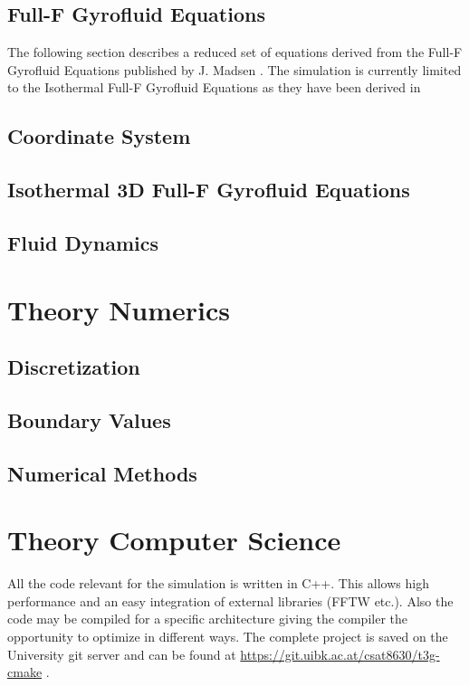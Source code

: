 \documentclass[12pt,oneside,bibtotoc,liststotoc]{scrbook}
\begin{document}
\section{Full-F Gyrofluid Equations}
The following section describes a reduced set of equations derived from the Full-F Gyrofluid Equations published by J. Madsen \cite{doi:10.1063/1.4813241}.
The simulation is currently limited to the Isothermal Full-F Gyrofluid Equations as they have been derived in

\section{Coordinate System}

% 
\section{Isothermal 3D Full-F Gyrofluid Equations}
\label{sec:isothermalequations}

% 


\section{Fluid Dynamics}
\label{sec:fluid-dynamics}

% 


\chapter{Theory Numerics}
\section{Discretization}

% 
\section{Boundary Values}

% 
\section{Numerical Methods}

% 

\chapter{Theory Computer Science}
All the code relevant for the simulation is written in C++. This allows high performance and an easy integration of external libraries (FFTW etc.). Also the code may be compiled for a specific architecture giving the compiler the opportunity to optimize in different ways.\newline
The complete project is saved on the University git server and can be found at \href{https://git.uibk.ac.at/csat8630/t3g-cmake}{https://git.uibk.ac.at/csat8630/t3g-cmake}
.
\end{document}
